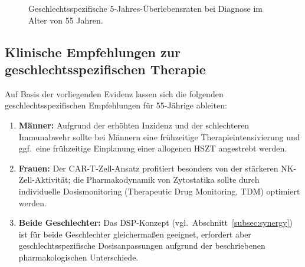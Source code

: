 ﻿\documentclass[12pt,a4paper]{article}
\theoremstyle{definition}
\begin{document}
\begin{figure}[ht]
\centering
{}
\caption{Geschlechtsspezifische 5-Jahres-Überlebensraten bei Diagnose im Alter von 55 Jahren.}
\label{fig:gender_bar}
\end{figure}

\subsection{Klinische Empfehlungen zur geschlechtsspezifischen Therapie}

Auf Basis der vorliegenden Evidenz lassen sich die folgenden geschlechtsspezifischen
Empfehlungen für 55-Jährige ableiten:

\begin{enumerate}
  \item \textbf{Männer:} Aufgrund der erhöhten Inzidenz und der schlechteren
        Immunabwehr sollte bei Männern eine frühzeitige Therapieintensivierung und
        ggf.\ eine frühzeitige Einplanung einer allogenen HSZT angestrebt werden.
  \item \textbf{Frauen:} Der CAR-T-Zell-Ansatz profitiert besonders von der
        stärkeren NK-Zell-Aktivität; die Pharmakodynamik von Zytostatika sollte
        durch individuelle Dosismonitoring (Therapeutic Drug Monitoring, TDM)
        optimiert werden.
  \item \textbf{Beide Geschlechter:} Das DSP-Konzept (vgl.\
        Abschnitt~\ref{subsec:synergy}) ist für beide Geschlechter gleichermaßen
        geeignet, erfordert aber geschlechtsspezifische Dosisanpassungen aufgrund
        der beschriebenen pharmakologischen Unterschiede.
\end{enumerate}
\end{document}
